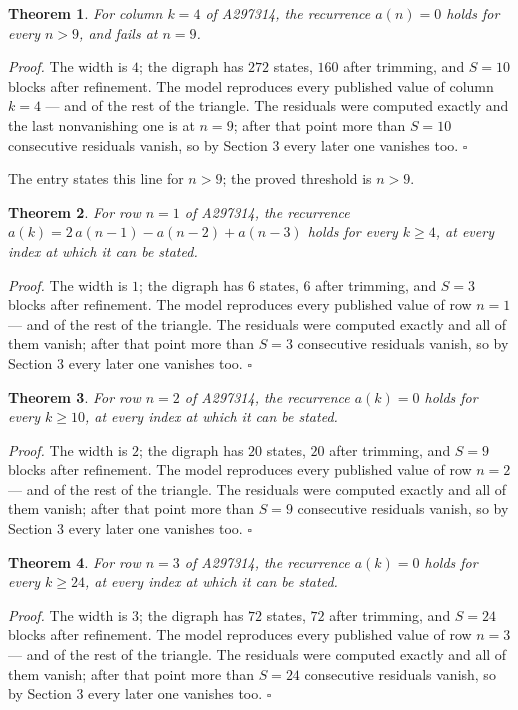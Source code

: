 \documentclass[11pt]{article}
\newtheorem{theorem}{Theorem}
\theoremstyle{definition}
\begin{document}
\begin{theorem} For column $k = 4$ of A297314, the recurrence $a(n) = 0$ holds for every $n > 9$, and fails at $n = 9$.\end{theorem}

{\itshape Proof.} The width is $4$; the digraph has $272$ states, $160$ after trimming, and $S = 10$ blocks after refinement. The model reproduces every published value of column $k = 4$ --- and of the rest of the triangle. The residuals were computed exactly and the last nonvanishing one is at $n = 9$; after that point more than $S = 10$ consecutive residuals vanish, so by Section 3 every later one vanishes too. $\square$

The entry states this line for $n > 9$; the proved threshold is $n > 9$.

\begin{theorem} For row $n = 1$ of A297314, the recurrence $a(k) = 2\,a(n-1) - a(n-2) + a(n-3)$ holds for every $k \ge 4$, at every index at which it can be stated.\end{theorem}

{\itshape Proof.} The width is $1$; the digraph has $6$ states, $6$ after trimming, and $S = 3$ blocks after refinement. The model reproduces every published value of row $n = 1$ --- and of the rest of the triangle. The residuals were computed exactly and all of them vanish; after that point more than $S = 3$ consecutive residuals vanish, so by Section 3 every later one vanishes too. $\square$

\begin{theorem} For row $n = 2$ of A297314, the recurrence $a(k) = 0$ holds for every $k \ge 10$, at every index at which it can be stated.\end{theorem}

{\itshape Proof.} The width is $2$; the digraph has $20$ states, $20$ after trimming, and $S = 9$ blocks after refinement. The model reproduces every published value of row $n = 2$ --- and of the rest of the triangle. The residuals were computed exactly and all of them vanish; after that point more than $S = 9$ consecutive residuals vanish, so by Section 3 every later one vanishes too. $\square$

\begin{theorem} For row $n = 3$ of A297314, the recurrence $a(k) = 0$ holds for every $k \ge 24$, at every index at which it can be stated.\end{theorem}

{\itshape Proof.} The width is $3$; the digraph has $72$ states, $72$ after trimming, and $S = 24$ blocks after refinement. The model reproduces every published value of row $n = 3$ --- and of the rest of the triangle. The residuals were computed exactly and all of them vanish; after that point more than $S = 24$ consecutive residuals vanish, so by Section 3 every later one vanishes too. $\square$
\end{document}
